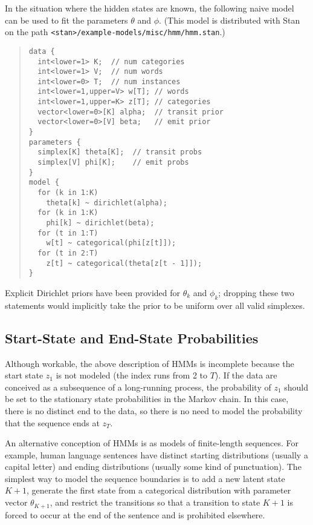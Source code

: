 In the situation where the hidden states are known, the following
naive model can be used to fit the parameters $\theta$ and $\phi$.
(This model is distributed with Stan on the path
\nolinkurl{<stan>/example-models/misc/hmm/hmm.stan}.)
%
\begin{quote}
\begin{Verbatim}[fontsize=\small]
data {
  int<lower=1> K;  // num categories
  int<lower=1> V;  // num words
  int<lower=0> T;  // num instances
  int<lower=1,upper=V> w[T]; // words
  int<lower=1,upper=K> z[T]; // categories
  vector<lower=0>[K] alpha;  // transit prior
  vector<lower=0>[V] beta;   // emit prior
}
parameters {
  simplex[K] theta[K];  // transit probs
  simplex[V] phi[K];    // emit probs
}
model {
  for (k in 1:K) 
    theta[k] ~ dirichlet(alpha);
  for (k in 1:K)
    phi[k] ~ dirichlet(beta);
  for (t in 1:T)
    w[t] ~ categorical(phi[z[t]]);
  for (t in 2:T)
    z[t] ~ categorical(theta[z[t - 1]]);
}
\end{Verbatim}
\end{quote}
%
Explicit Dirichlet priors have been provided for $\theta_k$ and
$\phi_k$; dropping these two statements would implicitly take the
prior to be uniform over all valid simplexes.

\subsection{Start-State and End-State Probabilities}

Although workable, the above description of HMMs is incomplete because
the start state $z_1$ is not modeled (the index runs from 2 to $T$).
If the data are conceived as a subsequence of a long-running process,
the probability of $z_1$ should be set to the stationary state
probabilities in the Markov chain.  In this case, there is no distinct
end to the data, so there is no need to model the probability that the
sequence ends at $z_T$.  

An alternative conception of HMMs is as models of finite-length
sequences.  For example, human language sentences have distinct
starting distributions (usually a capital letter) and ending
distributions (usually some kind of punctuation).  The simplest way to
model the sequence boundaries is to add a new latent state $K+1$,
generate the first state from a categorical distribution with
parameter vector $\theta_{K+1}$, and restrict the transitions so that
a transition to state $K+1$ is forced to occur at the end of the
sentence and is prohibited elsewhere.

